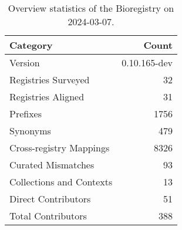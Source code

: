 \begin{table}
\caption{Overview statistics of the Bioregistry on 2024-03-07.}
\label{tab:bioregistry-summary}
\begin{tabular}{lr}
\toprule
Category & Count \\
\midrule
Version & 0.10.165-dev \\
Registries Surveyed & 32 \\
Registries Aligned & 31 \\
Prefixes & 1756 \\
Synonyms & 479 \\
Cross-registry Mappings & 8326 \\
Curated Mismatches & 93 \\
Collections and Contexts & 13 \\
Direct Contributors & 51 \\
Total Contributors & 388 \\
\bottomrule
\end{tabular}
\end{table}
